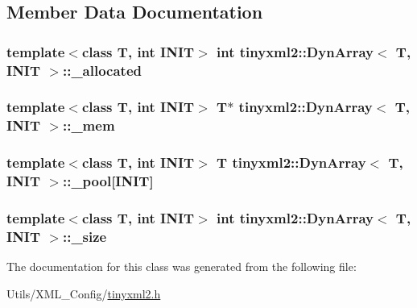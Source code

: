 \subsection{Member Data Documentation}
\hypertarget{classtinyxml2_1_1_dyn_array_a9bcaa041ce3fcd254328200debebc979}{
\subsubsection[{\-\_\-allocated}]{\setlength{\rightskip}{0pt plus 5cm}template$<$class T, int I\-N\-I\-T$>$ int {\bf tinyxml2\-::\-Dyn\-Array}$<$ T, I\-N\-I\-T $>$\-::\-\_\-allocated\hspace{0.3cm}{\ttfamily [private]}}}\label{classtinyxml2_1_1_dyn_array_a9bcaa041ce3fcd254328200debebc979}
\hypertarget{classtinyxml2_1_1_dyn_array_a2fe3376b05543f93edf3ba1bc4947e6d}{
\subsubsection[{\-\_\-mem}]{\setlength{\rightskip}{0pt plus 5cm}template$<$class T, int I\-N\-I\-T$>$ T$\ast$ {\bf tinyxml2\-::\-Dyn\-Array}$<$ T, I\-N\-I\-T $>$\-::\-\_\-mem\hspace{0.3cm}{\ttfamily [private]}}}\label{classtinyxml2_1_1_dyn_array_a2fe3376b05543f93edf3ba1bc4947e6d}
\hypertarget{classtinyxml2_1_1_dyn_array_ac00ff7104e1f9eb7a6d2e6f410cd7c12}{
\subsubsection[{\-\_\-pool}]{\setlength{\rightskip}{0pt plus 5cm}template$<$class T, int I\-N\-I\-T$>$ T {\bf tinyxml2\-::\-Dyn\-Array}$<$ T, I\-N\-I\-T $>$\-::\-\_\-pool\mbox{[}I\-N\-I\-T\mbox{]}\hspace{0.3cm}{\ttfamily [private]}}}\label{classtinyxml2_1_1_dyn_array_ac00ff7104e1f9eb7a6d2e6f410cd7c12}
\hypertarget{classtinyxml2_1_1_dyn_array_a7177b0ed99f814eb04be4388f1f4320f}{
\subsubsection[{\-\_\-size}]{\setlength{\rightskip}{0pt plus 5cm}template$<$class T, int I\-N\-I\-T$>$ int {\bf tinyxml2\-::\-Dyn\-Array}$<$ T, I\-N\-I\-T $>$\-::\-\_\-size\hspace{0.3cm}{\ttfamily [private]}}}\label{classtinyxml2_1_1_dyn_array_a7177b0ed99f814eb04be4388f1f4320f}


The documentation for this class was generated from the following file\-:\begin{DoxyCompactItemize}
\item 
Utils/\-X\-M\-L\-\_\-\-Config/\hyperlink{tinyxml2_8h}{tinyxml2.\-h}\end{DoxyCompactItemize}
